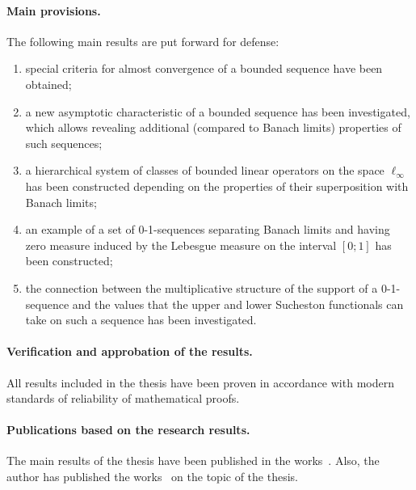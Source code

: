 \paragraph{Main provisions.}
The following main results are put forward for defense:
\begin{enumerate}
	\item
		special criteria for almost convergence of a bounded sequence have been obtained;
	\item
		a new asymptotic characteristic of a bounded sequence has been investigated,
		which allows revealing additional (compared to Banach limits) properties
		of such sequences;
	\item
		a hierarchical system of classes of bounded linear operators
		on the space $\ell_\infty$ has been constructed depending on the properties of their superposition with Banach limits;
	\item
		an example of a set of 0-1-sequences separating Banach limits
		and having zero measure induced by the Lebesgue measure on the interval $[0;1]$ has been constructed;
	\item
		the connection between the multiplicative structure of the support of a 0-1-sequence
		and the values that the upper and lower Sucheston functionals can take on such a sequence has been investigated.
\end{enumerate}


\paragraph{Verification and approbation of the results.}

All results included in the thesis have been proven
in accordance with modern standards of reliability of mathematical proofs.



\paragraph{Publications based on the research results.}
The main results of the thesis have been published in the works~.
Also, the author has published the works~
on the topic of the thesis.

